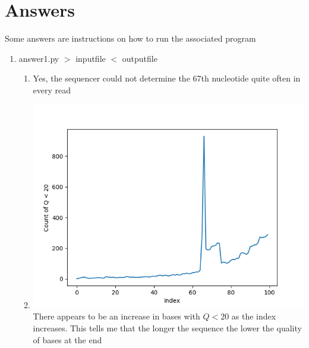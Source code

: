 \documentclass[12pt]{article}
\begin{document}
\maketitle

\section*{Answers}
Some answers are instructions on how to run the associated program
\begin{enumerate}
    \item answer1.py $>$ inputfile $<$ outputfile
    \begin{enumerate}[label=(\alph*)]
            \item Yes, the sequencer could not determine the 67th nucleotide quite often in every read
            \item
            \includegraphics[scale=0.651]{trend.png}
            \\There appears to be an increase in bases with $Q < 20$ as the index increases. This tells me that the
            longer the sequence the lower the quality of bases at the end



\end{enumerate}
\end{enumerate}
\end{document}
